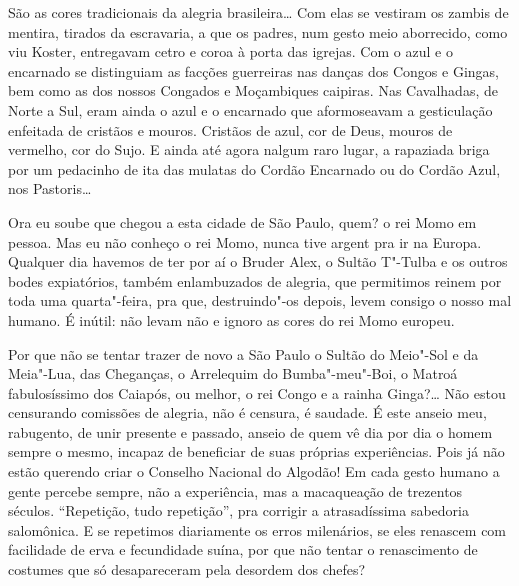 São as cores tradicionais da alegria brasileira\ldots{} Com elas se vestiram
os zambis de mentira, tirados da escravaria, a que os padres, num gesto
meio aborrecido, como viu Koster, entregavam cetro e coroa à porta das
igrejas. Com o azul e o encarnado se distinguiam as facções guerreiras
nas danças dos Congos e Gingas, bem como as dos nossos Congados e
Moçambiques caipiras. Nas Cavalhadas, de Norte a Sul, eram ainda o azul
e o encarnado que aformoseavam a gesticulação enfeitada de cristãos e
mouros. Cristãos de azul, cor de Deus, mouros de vermelho, cor do Sujo.
E ainda até agora nalgum raro lugar, a rapaziada briga por um pedacinho
de ita das mulatas do Cordão Encarnado ou do Cordão Azul, nos
Pastoris\ldots{}

Ora eu soube que chegou a esta cidade de São Paulo, quem? o rei Momo em
pessoa. Mas eu não conheço o rei Momo, nunca tive argent pra ir na
Europa. Qualquer dia havemos de ter por aí o Bruder Alex, o Sultão
T"-Tulba e os outros bodes expiatórios, também enlambuzados de alegria,
que permitimos reinem por toda uma quarta"-feira, pra que, destruindo"-os
depois, levem consigo o nosso mal humano. É inútil: não levam não e
ignoro as cores do rei Momo europeu.

Por que não se tentar trazer de novo a São Paulo o Sultão do Meio"-Sol e
da Meia"-Lua, das Cheganças, o Arrelequim do Bumba"-meu"-Boi, o Matroá
fabulosíssimo dos Caiapós, ou melhor, o rei Congo e a rainha Ginga?\ldots{}
Não estou censurando comissões de alegria, não é censura, é saudade. É
este anseio meu, rabugento, de unir presente e passado, anseio de quem
vê dia por dia o homem sempre o mesmo, incapaz de beneficiar de suas
próprias experiências. Pois já não estão querendo criar o Conselho
Nacional do Algodão! Em cada gesto humano a gente percebe sempre, não a
experiência, mas a macaqueação de trezentos séculos. ``Repetição, tudo
repetição'', pra corrigir a atrasadíssima sabedoria salomônica. E se
repetimos diariamente os erros milenários, se eles renascem com
facilidade de erva e fecundidade suína, por que não tentar o
renascimento de costumes que só desapareceram pela desordem dos chefes?

